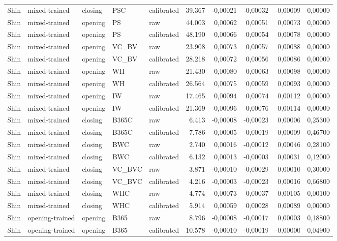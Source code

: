 {\begin{longtable}{@{}lllllrrrrr@{}}
Shin & mixed-trained & closing & PSC & calibrated & 39.367 & -0,00021 & -0,00032 & -0,00009 & 0,00000 \\
Shin & mixed-trained & opening & PS & raw & 44.003 & 0,00062 & 0,00051 & 0,00073 & 0,00000 \\
Shin & mixed-trained & opening & PS & calibrated & 48.190 & 0,00066 & 0,00054 & 0,00078 & 0,00000 \\
Shin & mixed-trained & opening & VC\_BV & raw & 23.908 & 0,00073 & 0,00057 & 0,00088 & 0,00000 \\
Shin & mixed-trained & opening & VC\_BV & calibrated & 28.218 & 0,00072 & 0,00056 & 0,00086 & 0,00000 \\
Shin & mixed-trained & opening & WH & raw & 21.430 & 0,00080 & 0,00063 & 0,00098 & 0,00000 \\
Shin & mixed-trained & opening & WH & calibrated & 26.564 & 0,00075 & 0,00059 & 0,00093 & 0,00000 \\
Shin & mixed-trained & opening & IW & raw & 17.465 & 0,00094 & 0,00074 & 0,00112 & 0,00000 \\
Shin & mixed-trained & opening & IW & calibrated & 21.369 & 0,00096 & 0,00076 & 0,00114 & 0,00000 \\
Shin & mixed-trained & closing & B365C & raw & 6.413 & -0,00008 & -0,00023 & 0,00006 & 0,25300 \\
Shin & mixed-trained & closing & B365C & calibrated & 7.786 & -0,00005 & -0,00019 & 0,00009 & 0,46700 \\
Shin & mixed-trained & closing & BWC & raw & 2.740 & 0,00016 & -0,00012 & 0,00046 & 0,28100 \\
Shin & mixed-trained & closing & BWC & calibrated & 6.132 & 0,00013 & -0,00003 & 0,00031 & 0,12000 \\
Shin & mixed-trained & closing & VC\_BVC & raw & 3.871 & -0,00010 & -0,00029 & 0,00010 & 0,30000 \\
Shin & mixed-trained & closing & VC\_BVC & calibrated & 4.216 & -0,00003 & -0,00023 & 0,00016 & 0,66800 \\
Shin & mixed-trained & closing & WHC & raw & 4.774 & 0,00073 & 0,00037 & 0,00105 & 0,00100 \\
Shin & mixed-trained & closing & WHC & calibrated & 5.914 & 0,00059 & 0,00028 & 0,00089 & 0,00000 \\
Shin & opening-trained & opening & B365 & raw & 8.796 & -0,00008 & -0,00017 & 0,00003 & 0,18800 \\
Shin & opening-trained & opening & B365 & calibrated & 10.578 & -0,00010 & -0,00019 & -0,00000 & 0,04900 \\

\end{longtable}}
